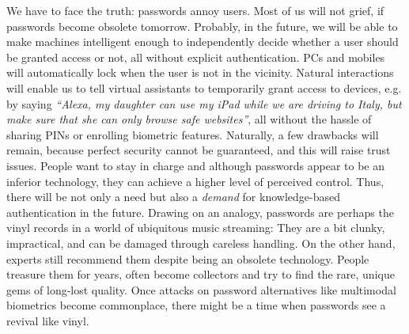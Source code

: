We have to face the truth: passwords annoy users. Most of us will not grief, if passwords become obsolete tomorrow. Probably, in the future, we will be able to make machines intelligent enough to independently decide whether a user should be granted access or not, all without explicit authentication. PCs and mobiles will automatically lock when the user is not in the vicinity. Natural interactions will enable us to tell virtual assistants to temporarily grant access to devices, e.g. by saying \textit{``Alexa, my daughter can use my iPad while we are driving to Italy, but make sure that she can only browse safe websites''}, all without the hassle of sharing PINs or enrolling biometric features. Naturally, a few drawbacks will remain, because perfect security cannot be guaranteed, and this will raise trust issues. People want to stay in charge and although passwords appear to be an inferior technology, they can achieve a higher level of perceived control. Thus, there will be not only a need but also a \textit{demand} for knowledge-based authentication in the future. Drawing on an analogy, passwords are perhaps the vinyl records in a world of ubiquitous music streaming: They are a bit clunky, impractical, and can be damaged through careless handling. On the other hand, experts still recommend them despite being an obsolete technology. People treasure them for years, often become collectors and try to find the rare, unique gems of long-lost quality. Once attacks on password alternatives like multimodal biometrics become commonplace, there might be a time when passwords see a revival like vinyl. 





